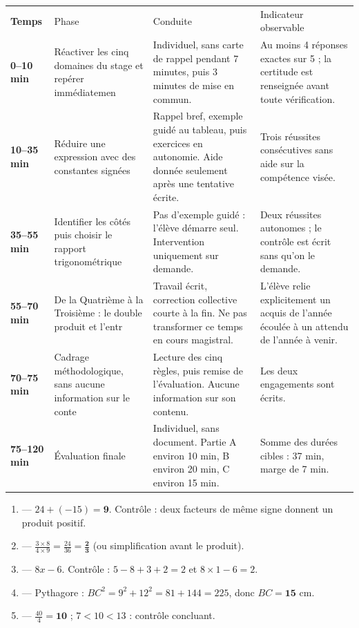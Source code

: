 \documentclass[10pt,a4paper]{article}
\begin{document}
\par\noindent\begin{tabularx}{\linewidth}{>{\bfseries}p{18mm} p{34mm} X X}
\rowcolor{Navy}\color{white}Temps & \color{white}Phase & \color{white}Conduite & \color{white}Indicateur observable \\
0--10 min & Réactiver les cinq domaines du stage et repérer immédiatemen & Individuel, sans carte de rappel pendant 7 minutes, puis 3 minutes de mise en commun. & Au moins 4 réponses exactes sur 5 ; la certitude est renseignée avant toute vérification. \\
10--35 min & Réduire une expression avec des constantes signées & Rappel bref, exemple guidé au tableau, puis exercices en autonomie. Aide donnée seulement après une tentative écrite. & Trois réussites consécutives sans aide sur la compétence visée. \\
35--55 min & Identifier les côtés puis choisir le rapport trigonométrique & Pas d'exemple guidé : l'élève démarre seul. Intervention uniquement sur demande. & Deux réussites autonomes ; le contrôle est écrit sans qu'on le demande. \\
55--70 min & De la Quatrième à la Troisième : le double produit et l'entr & Travail écrit, correction collective courte à la fin. Ne pas transformer ce temps en cours magistral. & L'élève relie explicitement un acquis de l'année écoulée à un attendu de l'année à venir. \\
70--75 min & Cadrage méthodologique, sans aucune information sur le conte & Lecture des cinq règles, puis remise de l'évaluation. Aucune information sur son contenu. & Les deux engagements sont écrits. \\
75--120 min & Évaluation finale & Individuel, sans document. Partie A environ 10 min, B environ 20 min, C environ 15 min. & Somme des durées cibles : 37 min, marge de 7 min. \\
\end{tabularx}
\newpage{}
\begin{enumerate}
\item {} --- $24 + (-15) = \mathbf{9}$. Contrôle : deux facteurs de même signe donnent un produit positif.
\item {} --- $\frac{3\times 8}{4\times 9}=\frac{24}{36}=\mathbf{\frac{2}{3}}$ (ou simplification avant le produit).
\item {} --- $8x-6$. Contrôle : $5-8+3+2=2$ et $8\times 1-6=2$.
\item {} --- Pythagore : $BC^2=9^2+12^2=81+144=225$, donc $BC=\mathbf{15}$ cm.
\item {} --- $\frac{40}{4}=\mathbf{10}$ ; $7 < 10 < 13$ : contrôle concluant.
\end{enumerate}
\end{document}
